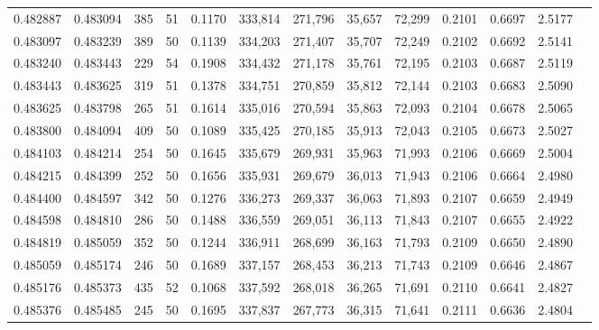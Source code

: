 \begin{tabular}{rrrrrrrrrrrrr}
0.482887 & 0.483094 &   385 &  51 &                                     0.1170 & 333,814 & 271,796 &  35,657 &  72,299 & 0.2101 & 0.6697 & 2.5177 \\
0.483097 & 0.483239 &   389 &  50 &                                     0.1139 & 334,203 & 271,407 &  35,707 &  72,249 & 0.2102 & 0.6692 & 2.5141 \\
0.483240 & 0.483443 &   229 &  54 &                                     0.1908 & 334,432 & 271,178 &  35,761 &  72,195 & 0.2103 & 0.6687 & 2.5119 \\
0.483443 & 0.483625 &   319 &  51 &                                     0.1378 & 334,751 & 270,859 &  35,812 &  72,144 & 0.2103 & 0.6683 & 2.5090 \\
0.483625 & 0.483798 &   265 &  51 &                                     0.1614 & 335,016 & 270,594 &  35,863 &  72,093 & 0.2104 & 0.6678 & 2.5065 \\
0.483800 & 0.484094 &   409 &  50 &                                     0.1089 & 335,425 & 270,185 &  35,913 &  72,043 & 0.2105 & 0.6673 & 2.5027 \\
0.484103 & 0.484214 &   254 &  50 &                                     0.1645 & 335,679 & 269,931 &  35,963 &  71,993 & 0.2106 & 0.6669 & 2.5004 \\
0.484215 & 0.484399 &   252 &  50 &                                     0.1656 & 335,931 & 269,679 &  36,013 &  71,943 & 0.2106 & 0.6664 & 2.4980 \\
0.484400 & 0.484597 &   342 &  50 &                                     0.1276 & 336,273 & 269,337 &  36,063 &  71,893 & 0.2107 & 0.6659 & 2.4949 \\
0.484598 & 0.484810 &   286 &  50 &                                     0.1488 & 336,559 & 269,051 &  36,113 &  71,843 & 0.2107 & 0.6655 & 2.4922 \\
0.484819 & 0.485059 &   352 &  50 &                                     0.1244 & 336,911 & 268,699 &  36,163 &  71,793 & 0.2109 & 0.6650 & 2.4890 \\
0.485059 & 0.485174 &   246 &  50 &                                     0.1689 & 337,157 & 268,453 &  36,213 &  71,743 & 0.2109 & 0.6646 & 2.4867 \\
0.485176 & 0.485373 &   435 &  52 &                                     0.1068 & 337,592 & 268,018 &  36,265 &  71,691 & 0.2110 & 0.6641 & 2.4827 \\
0.485376 & 0.485485 &   245 &  50 &                                     0.1695 & 337,837 & 267,773 &  36,315 &  71,641 & 0.2111 & 0.6636 & 2.4804 \\

\end{tabular}
